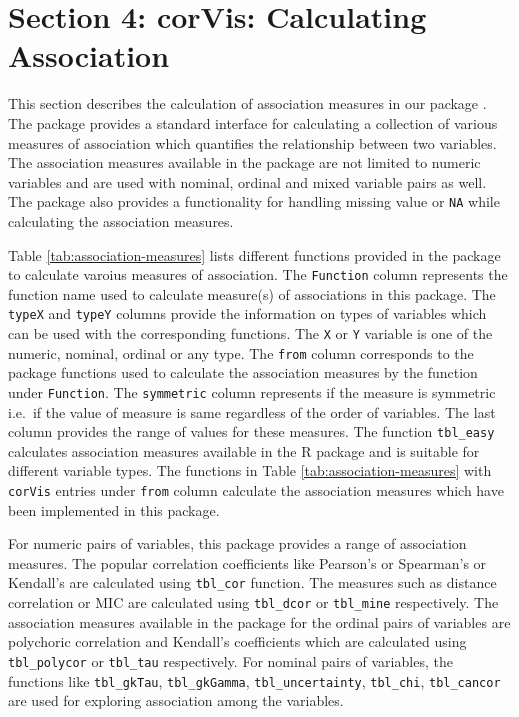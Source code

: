 \hypertarget{section-4-corvis-calculating-association}{%
\section{Section 4: corVis: Calculating
Association}\label{section-4-corvis-calculating-association}}

This section describes the calculation of association measures in our
package . The package provides a standard interface for
calculating a collection of various measures of association which
quantifies the relationship between two variables. The association
measures available in the package are not limited to numeric variables
and are used with nominal, ordinal and mixed variable pairs as well. The
package also provides a functionality for handling missing value or
\texttt{NA} while calculating the association measures.

Table \ref{tab:association-measures} lists different functions provided
in the package to calculate varoius measures of association. The
\texttt{Function} column represents the function name used to calculate
measure(s) of associations in this package. The \texttt{typeX} and
\texttt{typeY} columns provide the information on types of variables
which can be used with the corresponding functions. The \texttt{X} or
\texttt{Y} variable is one of the numeric, nominal, ordinal or any type.
The \texttt{from} column corresponds to the package functions used to
calculate the association measures by the function under
\texttt{Function}. The \texttt{symmetric} column represents if the
measure is symmetric i.e.~if the value of measure is same regardless of
the order of variables. The last column provides the range of values for
these measures. The function \texttt{tbl\_easy} calculates association
measures available in the R package  and is
suitable for different variable types. The functions in Table
\ref{tab:association-measures} with \texttt{corVis} entries under
\texttt{from} column calculate the association measures which have been
implemented in this package.

For numeric pairs of variables, this package provides a range of
association measures. The popular correlation coefficients like
Pearson's or Spearman's or Kendall's are calculated using
\texttt{tbl\_cor} function. The measures such as distance correlation or
MIC are calculated using \texttt{tbl\_dcor} or \texttt{tbl\_mine}
respectively. The association measures available in the package for the
ordinal pairs of variables are polychoric correlation and Kendall's
coefficients which are calculated using \texttt{tbl\_polycor} or
\texttt{tbl\_tau} respectively. For nominal pairs of variables, the
functions like \texttt{tbl\_gkTau}, \texttt{tbl\_gkGamma},
\texttt{tbl\_uncertainty}, \texttt{tbl\_chi}, \texttt{tbl\_cancor} are
used for exploring association among the variables.


